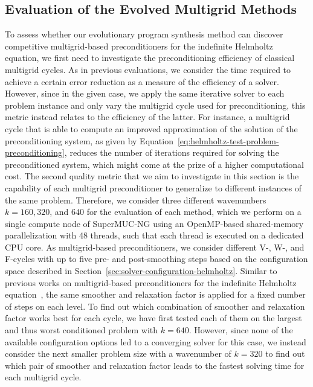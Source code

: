 \subsection{Evaluation of the Evolved Multigrid Methods}
To assess whether our evolutionary program synthesis method can discover competitive multigrid-based preconditioners for the indefinite Helmholtz equation, we first need to investigate the preconditioning efficiency of classical multigrid cycles.
As in previous evaluations, we consider the time required to achieve a certain error reduction as a measure of the efficiency of a solver.
However, since in the given case, we apply the same iterative solver to each problem instance and only vary the multigrid cycle used for preconditioning, this metric instead relates to the efficiency of the latter.
For instance, a multigrid cycle that is able to compute an improved approximation of the solution of the preconditioning system, as given by Equation~\eqref{eq:helmholtz-test-problem-preconditioning}, reduces the number of iterations required for solving the preconditioned system, which might come at the prize of a higher computational cost.
The second quality metric that we aim to investigate in this section is the capability of each multigrid preconditioner to generalize to different instances of the same problem.
Therefore, we consider three different wavenumbers $k = 160, 320$, and $640$ for the evaluation of each method, which we perform on a single compute node of SuperMUC-NG using an OpenMP-based shared-memory parallelization  with 48 threads, such that each thread is executed on a dedicated CPU core.
As multigrid-based preconditioners, we consider different V-, W-, and F-cycles with up to five pre- and post-smoothing steps based on the configuration space described in Section~\ref{sec:solver-configuration-helmholtz}.
Similar to previous works on multigrid-based preconditioners for the indefinite Helmholtz equation~\cite{erlangga2006multigrid,erlangga2008advances,cocquet2017shift}, the same smoother and relaxation factor is applied for a fixed number of steps on each level.
To find out which combination of smoother and relaxation factor works best for each cycle, we have first tested each of them on the largest and thus worst conditioned problem with $k = 640$.
However, since none of the available configuration options led to a converging solver for this case, we instead consider the next smaller problem size with a wavenumber of $k = 320$ to find out which pair of smoother and relaxation factor leads to the fastest solving time for each multigrid cycle.
